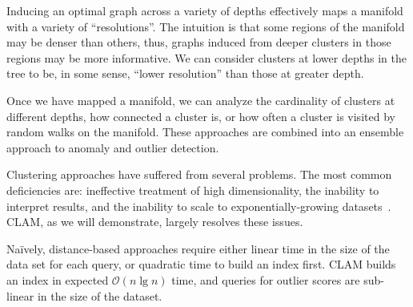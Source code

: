 Inducing an optimal graph across a variety of depths effectively maps a manifold with a variety of ``resolutions''.
The intuition is that some regions of the manifold may be denser than others, thus, graphs induced from deeper clusters in those regions may be more informative.
We can consider clusters at lower depths in the tree to be, in some sense, ``lower resolution'' than those at greater depth.

Once we have mapped a manifold, we can analyze the cardinality of clusters at different depths, how connected a cluster is, or how often a cluster is visited by random walks on the manifold.
These approaches are combined into an ensemble approach to anomaly and outlier detection.

Clustering approaches have suffered from several problems.
The most common deficiencies are:
ineffective treatment of high dimensionality,
the inability to interpret results, and
the inability to scale to exponentially-growing datasets~\cite{agrawal1998automatic}.
CLAM, as we will demonstrate, largely resolves these issues.

Na\"ively, distance-based approaches require either linear time in the size of the data set for each query,
or quadratic time to build an index first.
CLAM builds an index in expected $\mathcal{O}(n \lg n)$ time, and queries for outlier scores are sub-linear in the size of the dataset.
